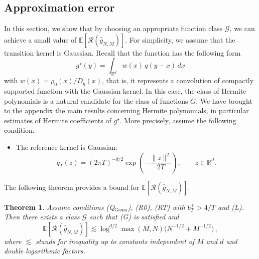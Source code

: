 \documentclass[11pt]{article}
\newtheorem{theorem}[proposition]{Theorem}
\theoremstyle{remark}
\numberwithin{equation}{section}
\newcommand{\R}{\mathbb{R}}
\newcommand{\E}{\mathbb{E}}
\def\bmax{b_T^{+}}
\begin{document}
\subsection{Approximation error}
In this section, we show that by choosing an appropriate function class $\mathcal{G}$, we can achieve a small value of $\E [\mathcal{R}(\widehat{g}_{N,M})]$. For simplicity, we assume that the transition kernel is Gaussian.  
Recall that the function has the following form
$$
g^\star(y) = \int_{\R^d} w(x)\,q(y-x)\,dx
$$ 
with $w(x) = \rho_0(x)/D_g(x)$, that is, it represents a convolution of compactly supported function with the Gaussian kernel. In this case, the class of Hermite polynomials is a natural candidate for the class of functions $G$. We have brought to the appendix the main results concerning Hermite polynomials, in particular estimates of Hermite coefficients of $g^\star$.
More precisely, assume the following condition.
\begin{itemize}[noitemsep, nolistsep]
 \item[(Q$_\mathrm{Gauss}$)] The reference kernel is Gaussian:
  \[
    q_T(z)
    =
    (2\pi T)^{-d/2}\exp\!\left(-\frac{\|z\|^2}{2T}\right),
    \qquad z \in \R^d.
  \]
 \end{itemize}
The following theorem provides a bound for $\E [\mathcal{R}(\widehat{g}_{N,M})]$.
\begin{theorem}
    \label{approx theorem risk}
    Assume conditions \emph{(Q$_\mathrm{Gauss}$)}, \emph{(R0)}, \emph{(RT)} with $\bmax > 4/T$ and \emph{(L)}. Then there exists a class $\mathcal G$ such that \emph{(G)} is satisfied  and
    $$
     \E [\mathcal{R}(\widehat{g}_{N,M})] \lesssim 
  \log^{d/2} \max(M, N) \Big(N^{-1/2} + M^{-1/2} \Big)\, , 
    $$
   where $\lesssim$ stands for inequality up to constants independent of  $M$ and $d$ and double logarithmic factors.
\end{theorem}
\end{document}
